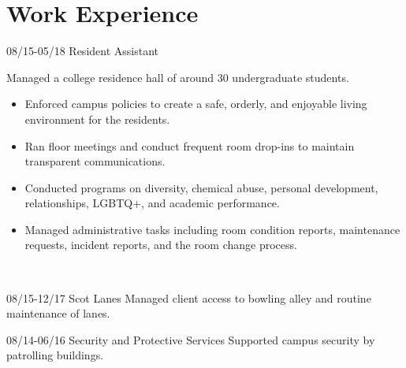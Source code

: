 \documentclass[]{friggeri-cv}
\begin{document}
\section{Work Experience}
\begin{entrylist}
  \entry
    {08/15-05/18}
    {Resident Assistant}
    {}
    {Managed a college residence hall of around 30 undergraduate students. 
    \begin{itemize}
        \item Enforced campus policies to create a safe, orderly, and enjoyable living environment for the residents.
        \item Ran floor meetings and conduct frequent room drop-ins to maintain transparent communications.
         \item Conducted programs on diversity, chemical abuse, personal development, relationships, LGBTQ+, and academic performance.
         \item Managed administrative tasks including room condition reports, maintenance requests, incident reports, and the room change process.
    \end{itemize}
     \\}
       \end{entrylist}
\begin{entrylist}
 
  \entry
    {08/15-12/17}
    {Scot Lanes}
    {}
    {Managed client access to bowling alley and routine maintenance of lanes.\\}
           \end{entrylist}
\begin{entrylist}
    \entry
    {08/14-06/16}
    {Security and Protective Services}
    {}
    {Supported campus security by patrolling buildings.\\}
\end{entrylist}
\end{document}
